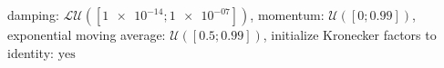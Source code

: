 damping: $\mathcal{LU}([\num[scientific-notation=true]{1e-14}; \num[scientific-notation=true]{1e-07}])$, momentum: $\mathcal{U}([\num[scientific-notation=false]{0}; \num[scientific-notation=true]{0.99}])$, exponential moving average: $\mathcal{U}([\num[scientific-notation=true]{0.5}; \num[scientific-notation=true]{0.99}])$, initialize Kronecker factors to identity: $\text{yes}$